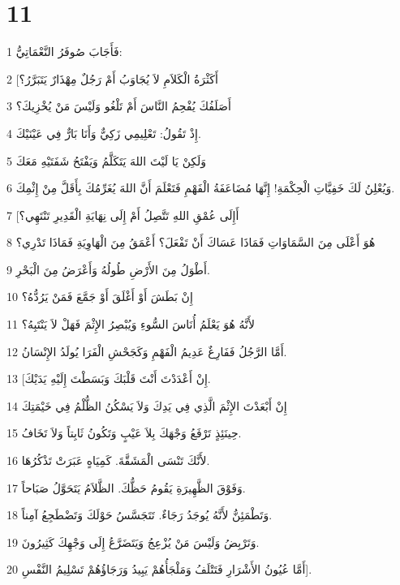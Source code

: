 \chapter{11}

\par 1 فَأَجَابَ صُوفَرُ النَّعْمَاتِيُّ:
\par 2 [أَكَثْرَةُ الْكَلاَمِ لاَ يُجَاوَبُ أَمْ رَجُلٌ مِهْذَارٌ يَتَبَرَّرُ؟
\par 3 أَصَلَفُكَ يُفْحِمُ النَّاسَ أَمْ تَلْغُو وَلَيْسَ مَنْ يُخْزِيكَ؟
\par 4 إِذْ تَقُولُ: تَعْلِيمِي زَكِيٌّ وَأَنَا بَارٌّ فِي عَيْنَيْكَ.
\par 5 وَلَكِنْ يَا لَيْتَ اللهَ يَتَكَلَّمُ وَيَفْتَحُ شَفَتَيْهِ مَعَكَ
\par 6 وَيُعْلِنُ لَكَ خَفِيَّاتِ الْحِكْمَةِ! إِنَّهَا مُضَاعَفَةُ الْفَهْمِ فَتَعْلَمَ أَنَّ اللهَ يُغَرِّمُكَ بِأَقَلَّ مِنْ إِثْمِكَ.
\par 7 [أَإِلَى عُمْقِ اللهِ تَتَّصِلُ أَمْ إِلَى نِهَايَةِ الْقَدِيرِ تَنْتَهِي؟
\par 8 هُوَ أَعْلَى مِنَ السَّمَاوَاتِ فَمَاذَا عَسَاكَ أَنْ تَفْعَلَ؟ أَعْمَقُ مِنَ الْهَاوِيَةِ فَمَاذَا تَدْرِي؟
\par 9 أَطْوَلُ مِنَ الأَرْضِ طُولُهُ وَأَعْرَضُ مِنَ الْبَحْرِ.
\par 10 إِنْ بَطَشَ أَوْ أَغْلَقَ أَوْ جَمَّعَ فَمَنْ يَرُدُّهُ؟
\par 11 لأَنَّهُ هُوَ يَعْلَمُ أُنَاسَ السُّوءِ وَيُبْصِرُ الإِثْمَ فَهَلْ لاَ يَنْتَبِهُ؟
\par 12 أَمَّا الرَّجُلُ فَفَارِغٌ عَدِيمُ الْفَهْمِ وَكَجَحْشِ الْفَرَا يُولَدُ الإِنْسَانُ.
\par 13 [إِنْ أَعْدَدْتَ أَنْتَ قَلْبَكَ وَبَسَطْتَ إِلَيْهِ يَدَيْكَ.
\par 14 إِنْ أَبْعَدْتَ الإِثْمَ الَّذِي فِي يَدِكَ وَلاَ يَسْكُنُ الظُّلْمُ فِي خَيْمَتِكَ
\par 15 حِينَئِذٍ تَرْفَعُ وَجْهَكَ بِلاَ عَيْبٍ وَتَكُونُ ثَابِتاً وَلاَ تَخَافُ.
\par 16 لأَنَّكَ تَنْسَى الْمَشَقَّةَ. كَمِيَاهٍ عَبَرَتْ تَذْكُرُهَا.
\par 17 وَفَوْقَ الظَّهِيرَةِ يَقُومُ حَظُّكَ. الظَّلاَمُ يَتَحَوَّلُ صَبَاحاً.
\par 18 وَتَطْمَئِنُّ لأَنَّهُ يُوجَدُ رَجَاءٌ. تَتَجَسَّسُ حَوْلَكَ وَتَضْطَجِعُ آمِناً.
\par 19 وَتَرْبِضُ وَلَيْسَ مَنْ يُزْعِجُ وَيَتَضَرَّعُ إِلَى وَجْهِكَ كَثِيرُونَ.
\par 20 أَمَّا عُيُونُ الأَشْرَارِ فَتَتْلَفُ وَمَلْجَأُهُمْ يَبِيدُ وَرَجَاؤُهُمْ تَسْلِيمُ النَّفْسِ].

